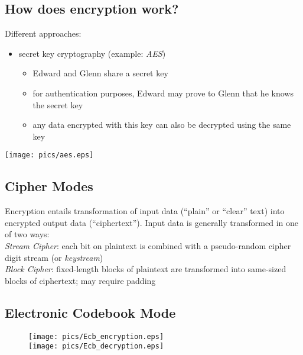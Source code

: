 \documentclass[xga]{xdvislides}
\begin{document}
\subsection{How does encryption work?}
Different approaches:
\begin{itemize}
	\item secret key cryptography (example: {\em AES})
		\begin{itemize}
			\item Edward and Glenn share a secret key
			\item for authentication purposes, Edward may prove
				to Glenn that he knows the secret key
			\item any data encrypted with this key
				can also be decrypted using the same key
		\end{itemize}
\end{itemize}

 \begin{center}
        \texttt{[image: pics/aes.eps]}
 \end{center}

\subsection{Cipher Modes}
Encryption entails transformation of input data (``plain''
or ``clear'' text) into encrypted output data
(``ciphertext'').  Input data is generally transformed
in one of two ways:
\\

{\em Stream Cipher}: each bit on plaintext is combined
with a pseudo-random cipher digit stream (or {\em keystream})
\\

{\em Block Cipher}: fixed-length blocks of plaintext
are transformed into same-sized blocks of ciphertext;
may require padding


\subsection{Electronic Codebook Mode}
\begin{figure}[hb]
    \begin{center}
        \texttt{[image: pics/Ecb\_encryption.eps]} \\
        \texttt{[image: pics/Ecb\_decryption.eps]} \\
    \end{center}
\end{figure}
\end{document}
